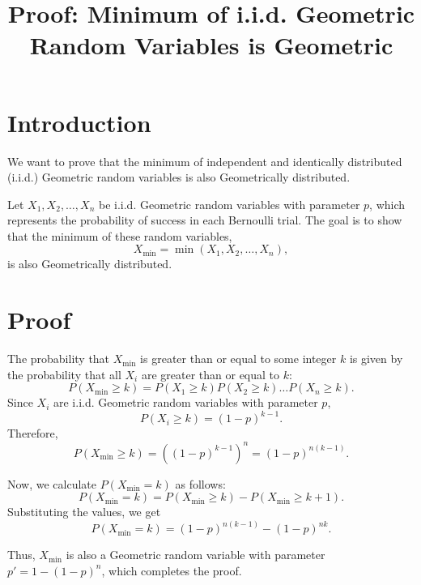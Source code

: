 \documentclass{article}
\title{Proof: Minimum of i.i.d. Geometric Random Variables is Geometric}
\author{}
\date{}
\begin{document}
\maketitle

\section*{Introduction}
We want to prove that the minimum of independent and identically distributed (i.i.d.) Geometric random variables is also Geometrically distributed.

Let \( X_1, X_2, \dots, X_n \) be i.i.d. Geometric random variables with parameter \( p \), which represents the probability of success in each Bernoulli trial. The goal is to show that the minimum of these random variables, 
\[
X_{\text{min}} = \min(X_1, X_2, \dots, X_n),
\]
is also Geometrically distributed.

\section*{Proof}
The probability that \( X_{\text{min}} \) is greater than or equal to some integer \( k \) is given by the probability that all \( X_i \) are greater than or equal to \( k \):
\[
P(X_{\text{min}} \geq k) = P(X_1 \geq k) P(X_2 \geq k) \dots P(X_n \geq k).
\]
Since \( X_i \) are i.i.d. Geometric random variables with parameter \( p \),
\[
P(X_i \geq k) = (1 - p)^{k - 1}.
\]
Therefore,
\[
P(X_{\text{min}} \geq k) = \left( (1 - p)^{k - 1} \right)^n = (1 - p)^{n(k - 1)}.
\]

Now, we calculate \( P(X_{\text{min}} = k) \) as follows:
\[
P(X_{\text{min}} = k) = P(X_{\text{min}} \geq k) - P(X_{\text{min}} \geq k + 1).
\]
Substituting the values, we get
\[
P(X_{\text{min}} = k) = (1 - p)^{n(k - 1)} - (1 - p)^{n k}.
\]

Thus, \( X_{\text{min}} \) is also a Geometric random variable with parameter \( p' = 1 - (1 - p)^n \), which completes the proof.
\end{document}
